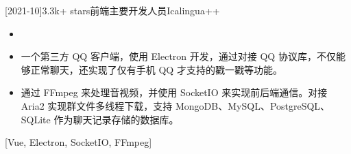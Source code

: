 \documentclass[zh]{resume}
\begin{document}
\begin{projects}

  \separator{0.5ex}
  [2021-10]{3.3k+ stars}{前端主要开发人员}{Icalingua++}{
    \begin{itemize}
      \item {}
      \item 一个第三方 QQ 客户端，使用 Electron 开发，通过对接 QQ 协议库，不仅能够正常聊天，还实现了仅有手机 QQ 才支持的戳一戳等功能。
      \item 通过 FFmpeg 来处理音视频，并使用 SocketIO 来实现前后端通信。对接 Aria2 实现群文件多线程下载，支持 MongoDB、MySQL、PostgreSQL、SQLite 作为聊天记录存储的数据库。
    \end{itemize}
  }[Vue, Electron, SocketIO, FFmpeg]
\end{projects}
\end{document}

